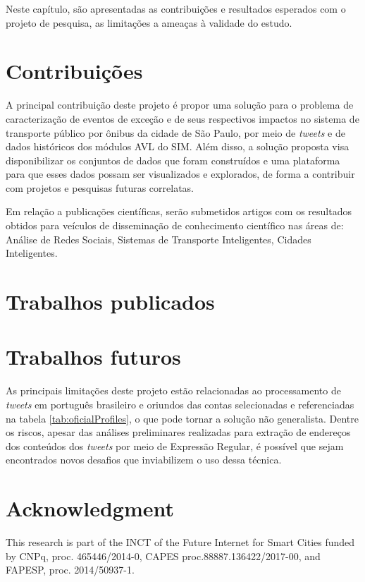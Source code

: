 \documentclass[
	12pt,				%
	oneside,			%
	a4paper,			%
	english,			%
	brazil				%
	]{abntex2ppgsi}
\begin{document}
Neste capítulo, são apresentadas as contribuições e resultados esperados com o projeto de pesquisa, as limitações a ameaças à validade do estudo. 

\section{Contribuições}

A principal contribuição deste projeto é propor uma solução para o problema de caracterização de eventos de exceção e de seus respectivos impactos no sistema de transporte público por ônibus da cidade de São Paulo, por meio de \textit{tweets} e de dados históricos dos módulos AVL do SIM. Além disso, a solução proposta visa disponibilizar os conjuntos de dados que foram construídos e uma plataforma para que esses dados possam ser visualizados e explorados, de forma a contribuir com projetos e pesquisas futuras correlatas.

Em relação a publicações científicas, serão submetidos artigos com os resultados obtidos para veículos de disseminação de conhecimento científico nas áreas de: Análise de Redes Sociais, Sistemas de Transporte Inteligentes, Cidades Inteligentes.

\section{Trabalhos publicados}

\section{Trabalhos futuros}
As principais limitações deste projeto estão relacionadas ao processamento de \textit{tweets} em português brasileiro e oriundos das contas selecionadas e referenciadas na tabela \ref{tab:oficialProfiles}, o que pode tornar a solução não generalista. Dentre os riscos, apesar das análises preliminares realizadas para extração de endereços dos conteúdos dos \textit{tweets} por meio de Expressão Regular, é possível que sejam encontrados novos desafios que inviabilizem o uso dessa técnica.

\section*{Acknowledgment}
This research is part of the INCT of the Future Internet for Smart Cities funded by CNPq, proc. 465446/2014-0, CAPES proc.88887.136422/2017-00, and FAPESP, proc. 2014/50937-1.
\end{document}
